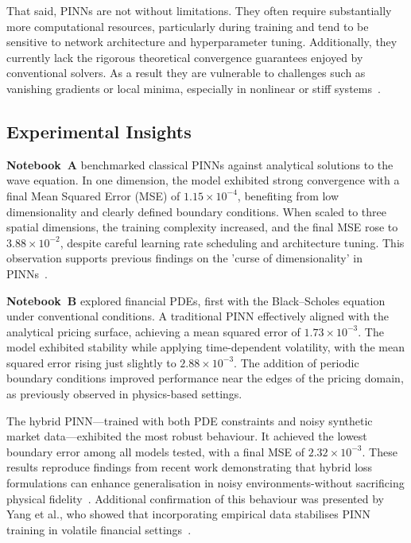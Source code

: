 \documentclass[12pt,a4paper]{article}
\begin{document}
That said, PINNs are not without limitations. They often require substantially more computational resources, particularly during training and tend to be sensitive to network architecture and hyperparameter tuning. Additionally, they currently lack the rigorous theoretical convergence guarantees enjoyed by conventional solvers. As a result they are vulnerable to challenges such as vanishing gradients or local minima, especially in nonlinear or stiff systems~\cite{wang2022understanding}.

\subsection{Experimental Insights}

\indent \textbf{Notebook~A} benchmarked classical PINNs against analytical solutions to the wave equation. In one dimension, the model exhibited strong convergence with a final Mean Squared Error (MSE) of \(1.15 \times 10^{-4}\), benefiting from low dimensionality and clearly defined boundary conditions. When scaled to three spatial dimensions, the training complexity increased, and the final MSE rose to \(3.88 \times 10^{-2}\), despite careful learning rate scheduling and architecture tuning. This observation supports previous findings on the 'curse of dimensionality' in PINNs~\cite{mishra2022estimates}.


\textbf{Notebook~B} explored financial PDEs, first with the Black–Scholes equation under conventional conditions. A traditional PINN effectively aligned with the analytical pricing surface, achieving a mean squared error of \(1.73 \times 10^{-3}\). The model exhibited stability while applying time-dependent volatility, with the mean squared error rising just slightly to \(2.88 \times 10^{-3}\). The addition of periodic boundary conditions improved performance near the edges of the pricing domain, as previously observed in physics-based settings.

The hybrid PINN—trained with both PDE constraints and noisy synthetic market data—exhibited the most robust behaviour. It achieved the lowest boundary error among all models tested, with a final MSE of \(2.32 \times 10^{-3}\). These results reproduce findings from recent work demonstrating that hybrid loss formulations can enhance generalisation in noisy environments-without sacrificing physical fidelity~\cite{finlay2022train}. Additional confirmation of this behaviour was presented by Yang et al., who showed that incorporating empirical data stabilises PINN training in volatile financial settings~\cite{yang2023hybrid}.
\end{document}
